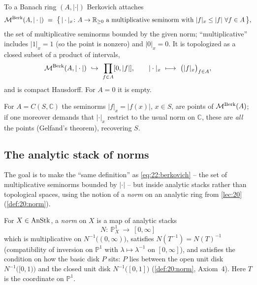 \begin{definition}
\label{def:22:berkovich-spectrum}
To a Banach ring $(A,|\cdot|)$ Berkovich attaches
\begin{equation}
\label{eq:22:berkovich}
\MBerk(A,|\cdot|)\ =\ \bigl\{\,|\cdot|_x\colon A\to\mathbb R_{\ge0}\ \text{a
multiplicative seminorm with } |f|_x\le|f|\ \forall f\in A\,\bigr\},
\end{equation}
the set of multiplicative seminorms bounded by the given norm; ``multiplicative''
includes $|1|_x=1$ (so the point is nonzero) and $|0|_x=0$. It is topologized as
a closed subset of a product of intervals,
\begin{equation*}
\mathcal{M}^{\mathrm{Berk}}(A,|\cdot|)\ \hookrightarrow\ \prod_{f\in A}[0,|f|],\qquad
|\cdot|_x\ \longmapsto\ \bigl(|f|_x\bigr)_{f\in A},
\end{equation*}
and is compact Hausdorff. For $A=0$ it is empty.
\end{definition}

\begin{example}
\label{ex:22:berkovich-CS}
For $A=C(S,\mathbb C)$ the seminorms $|f|_x=|f(x)|$, $x\in S$, are points of
$\mathcal{M}^{\mathrm{Berk}}(A)$; if one moreover demands that $|\cdot|_x$ restrict to the usual norm
on $\mathbb C$, these are \emph{all} the points (Gelfand's theorem), recovering
$S$.
\end{example}

\subsection{The analytic stack of norms}
\label{subsec:22:norms}

The goal is to make the ``same definition'' as \eqref{eq:22:berkovich} -- the
set of multiplicative seminorms bounded by $|\cdot|$ -- but inside analytic
stacks rather than topological spaces, using the notion of a \emph{norm} on an
analytic ring from \cref{lec:20} (\cref{def:20:norm}).

\begin{definition}
\label{def:22:norm}
For $X\in\operatorname{AnStk}$, a \emph{norm} on $X$ is a map of analytic stacks
\begin{equation*}
N\colon\ \mathbb P^1_X\ \longrightarrow\ [0,\infty]
\end{equation*}
which is multiplicative on $N^{-1}\bigl((0,\infty)\bigr)$, satisfies
$N(T^{-1})=N(T)^{-1}$ (compatibility of inversion on $\mathbb P^1$ with
$\lambda\mapsto\lambda^{-1}$ on $[0,\infty]$), and satisfies the condition on
how the basic disk $P$ sits: $P$ lies between the open unit disk
$N^{-1}\bigl([0,1)\bigr)$ and the closed unit disk $N^{-1}\bigl([0,1]\bigr)$
(\cref{def:20:norm}, Axiom~4). Here $T$ is the coordinate on $\mathbb P^1$.
\end{definition}

